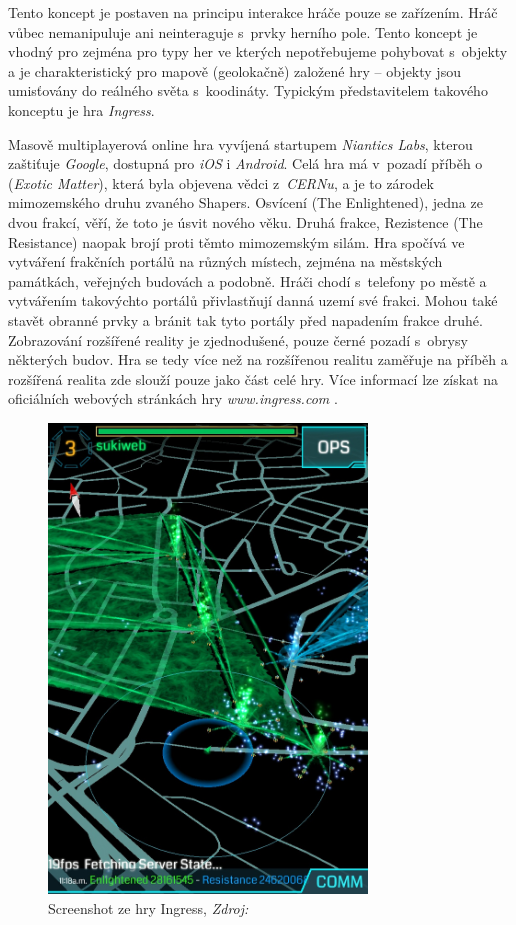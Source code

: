 \documentclass[twoside,12pt]{article}
\begin{document}
Tento koncept je postaven na principu interakce hráče pouze se zařízením. Hráč vůbec nemanipuluje ani neinteraguje s~prvky herního pole. Tento koncept je vhodný pro zejména pro typy her ve kterých nepotřebujeme pohybovat s~objekty a je charakteristický pro mapově (geolokačně) založené hry -- objekty jsou umisťovány do reálného světa s~koodináty. Typickým představitelem takového konceptu je hra \textit{Ingress}.

%
% 

Masově multiplayerová online hra vyvíjená startupem \textit{Niantics Labs}, kterou zaštiťuje \textit{Google}, dostupná pro \textit{iOS} i \textit{Android}. Celá hra má v~pozadí příběh o~ (\textit{Exotic Matter}), která byla objevena vědci z~\textit{CERNu}, a je to zárodek mimozemského druhu zvaného Shapers. Osvícení (The Enlightened), jedna ze dvou frakcí, věří, že toto je úsvit nového věku. Druhá frakce, Rezistence (The Resistance) naopak brojí proti těmto mimozemským silám. Hra spočívá ve vytváření frakčních portálů na různých místech, zejména na městských památkách, veřejných budovách a podobně. Hráči chodí s~telefony po městě a vytvářením takovýchto portálů přivlastňují danná uzemí své frakci. Mohou také stavět obranné prvky a bránit tak tyto portály před napadením frakce druhé. Zobrazování rozšířené reality je zjednodušené, pouze černé pozadí s~obrysy některých budov. Hra se tedy více než na rozšířenou realitu zaměřuje na příběh a rozšířená realita zde slouží pouze jako část celé hry. Více informací lze získat na oficiálních webových stránkách hry \textit{www.ingress.com} \cite{ingress}.


\begin{figure}[H]
    \centering
    \includegraphics[width=320px, center]{images/ingress.jpg}
    \caption[ingress_screenshot]{Screenshot ze hry Ingress, \textit{Zdroj: \cite{ingress_screenshot}}}
    \label{ingress_screenshot}
\end{figure}
\end{document}
